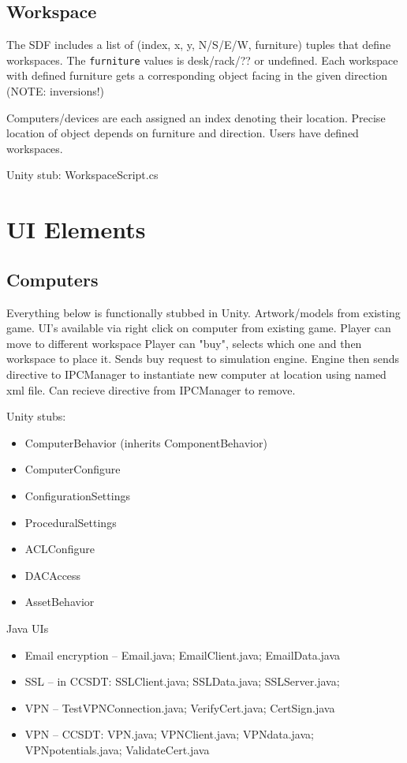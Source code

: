 \documentclass{article}
\begin{document}
\subsection{Workspace}
The SDF includes a list of (index, x, y, {N/S/E/W}, furniture) tuples that define workspaces.
The {\tt furniture} values is desk/rack/??  or undefined.
Each workspace with defined furniture gets a corresponding object facing in the given direction (NOTE: inversions!) 

Computers/devices are each assigned an index denoting their location.  Precise location of object depends on
furniture and direction.  Users have defined workspaces.

Unity stub: WorkspaceScript.cs

\section{UI Elements}

\subsection{Computers}
Everything below is functionally stubbed in Unity.
Artwork/models from existing game.  
UI's available via right click on computer from existing game.
Player can move to different workspace
Player can "buy", selects which one and then workspace to place it.  Sends buy request to simulation engine.  Engine then sends
directive to IPCManager to instantiate new computer at location using named xml file.
Can recieve directive from IPCManager to remove.

\noindent Unity stubs:
\begin{itemize}
\item ComputerBehavior (inherits ComponentBehavior)
\item ComputerConfigure
\item ConfigurationSettings
\item ProceduralSettings
\item ACLConfigure
\item DACAccess
\item AssetBehavior
\end{itemize}
\noindent Java UIs
\begin{itemize}
\item Email encryption -- Email.java; EmailClient.java; EmailData.java
\item SSL -- in CCSDT: SSLClient.java; SSLData.java; SSLServer.java; 
\item VPN -- TestVPNConnection.java; VerifyCert.java; CertSign.java
\item VPN -- CCSDT: VPN.java; VPNClient.java; VPNdata.java; VPNpotentials.java; ValidateCert.java
\end{itemize}
\end{document}
